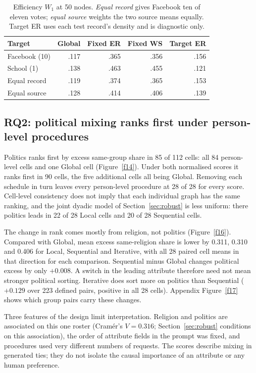 \documentclass{article}
\begin{document}
\begin{table}[tb]\centering
\caption{Efficiency $W_1$ at 50 nodes. \emph{Equal record} gives Facebook ten of eleven votes; \emph{equal source} weights the two source means equally. Target ER uses each test record's density and is diagnostic only.}\label{tab:w}
\small\setlength{\tabcolsep}{3.5pt}
\begin{tabular}{lrrrr}\toprule Target & Global & Fixed ER & Fixed WS & Target ER\\\midrule
Facebook (10)&.117&.365&.356&.156\\School (1)&.138&.463&.455&.121\\Equal record&.119&.374&.365&.153\\Equal source&.128&.414&.406&.139\\\bottomrule\end{tabular}\end{table}

\subsection{RQ2: political mixing ranks first under person-level procedures}\label{sec:mixing}
Politics ranks first by excess same-group share in 85 of 112 cells: all 84 person-level cells and one Global cell (Figure~\ref{f14}). Under both normalised scores it ranks first in 90 cells, the five additional cells all being Global. Removing each schedule in turn leaves every person-level procedure at 28 of 28 for every score. Cell-level consistency does not imply that each individual graph has the same ranking, and the joint dyadic model of Section~\ref{sec:robust} is less uniform: there politics leads in 22 of 28 Local cells and 20 of 28 Sequential cells.

The change in rank comes mostly from religion, not politics (Figure~\ref{f16}). Compared with Global, mean excess same-religion share is lower by 0.311, 0.310 and 0.406 for Local, Sequential and Iterative, with all 28 paired cell means in that direction for each comparison. Sequential minus Global changes political excess by only $+0.008$. A switch in the leading attribute therefore need not mean stronger political sorting. Iterative does sort more on politics than Sequential ($+0.129$ over 223 defined pairs, positive in all 28 cells). Appendix Figure~\ref{f17} shows which group pairs carry these changes.

Three features of the design limit interpretation. Religion and politics are associated on this one roster (Cram\'er's $V=0.316$; Section~\ref{sec:robust} conditions on this association), the order of attribute fields in the prompt was fixed, and procedures used very different numbers of requests. The scores describe mixing in generated ties; they do not isolate the causal importance of an attribute or any human preference.
\end{document}
